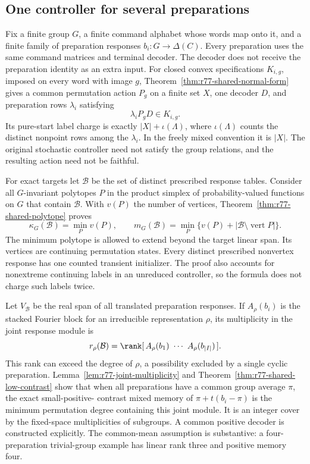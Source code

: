 \subsection*{One controller for several preparations}

Fix a finite group $G$, a finite command alphabet whose words map onto it, and
a finite family of preparation responses $b_i:G\to\Delta(C)$.
Every preparation uses the same command matrices and terminal decoder.
The decoder does not receive the preparation identity as an extra
input.  For closed convex specifications $K_{i,g}$, imposed on every
word with image $g$, Theorem~\ref{thm:r77-shared-normal-form} gives
a common permutation action $P_g$ on a finite set $X$, one decoder
$D$, and preparation rows $\lambda_i$ satisfying
\[
 \lambda_iP_gD\in K_{i,g}.
\]
Its pure-start label charge is exactly
$|X|+\iota(\Lambda)$, where $\iota(\Lambda)$ counts the distinct
nonpoint rows among the $\lambda_i$.  In the freely mixed convention
it is $|X|$.  The original stochastic controller need not satisfy the
group relations, and the resulting action need not be faithful.

For exact targets let $\mathcal B$ be the set of distinct prescribed
response tables.  Consider all $G$-invariant polytopes $P$ in the
product simplex of probability-valued functions on $G$ that contain
$\mathcal B$.  With $v(P)$ the number of vertices,
Theorem~\ref{thm:r77-shared-polytope} proves
\begin{equation}\label{eq:r77-intro-polytope}
 \kappa_G(\mathcal B)=\min_P v(P),\qquad
 m_G(\mathcal B)=\min_P\{v(P)+|\mathcal B\setminus\operatorname{vert}P|\}.
\end{equation}
The minimum polytope is allowed to extend beyond the target linear
span.  Its vertices are continuing permutation states.  Every distinct
prescribed nonvertex response has one counted transient initializer.
The proof also accounts for nonextreme continuing labels in an
unreduced controller, so the formula does not charge such labels twice.

Let $V_{\mathcal B}$ be the real span of all translated preparation
responses.  If $A_\rho(b_i)$ is the stacked Fourier block for an
irreducible representation $\rho$, its multiplicity in the joint
response module is
\[
 r_\rho(\mathcal B)
 =\rank[\,A_\rho(b_1)\ \cdots\ A_\rho(b_{|I|})\,].
\]
This rank can exceed the degree of $\rho$, a possibility excluded by
a single cyclic preparation.  Lemma~\ref{lem:r77-joint-multiplicity}
and Theorem~\ref{thm:r77-shared-low-contrast} show that when all
preparations have a common group average $\pi$, the exact small-positive-
contrast mixed memory of $\pi+t(b_i-\pi)$ is the minimum permutation
degree containing this joint module.  It is an integer cover by the
fixed-space multiplicities of subgroups.  A common positive decoder
is constructed explicitly.  The common-mean assumption is substantive:
a four-preparation trivial-group example has linear rank three and
positive memory four.

